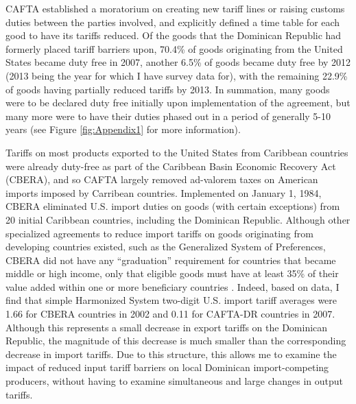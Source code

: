 \documentclass[12pt]{article}
\begin{document}
CAFTA established a moratorium on creating new tariff lines or raising customs 
duties between the parties involved, and explicitly defined a time table for each good to have its 
tariffs reduced. Of the goods that the Dominican Republic had formerly placed tariff barriers upon,
70.4\% of goods originating from the United States became duty free in 2007, another 6.5\%
of goods became duty free by 2012 (2013 being the year for which I have survey data for), with
the remaining 22.9\% of goods having partially reduced tariffs by 2013.
In summation, many goods were to be declared duty free initially upon implementation of the agreement, 
but many more were to have their duties phased out in a period of generally 5-10 years 
(see Figure \ref{fig:Appendix1} for more information). 

Tariffs on most products exported to the United States from Caribbean countries were 
already duty-free as part of the Caribbean Basin Economic Recovery Act (CBERA), and so CAFTA largely 
removed ad-valorem taxes on American imports imposed by Carribean countries. 
Implemented on January 1, 1984, CBERA eliminated U.S. import duties on goods (with certain
exceptions) from 20 initial Caribbean countries, including the Dominican Republic.
Although other specialized agreements to reduce import tariffs on goods originating from developing 
countries existed, such as the Generalized System of Preferences, CBERA did not have any ``graduation''
requirement for countries that became middle or high income, only that eligible  
goods must have at least 35\% of their value added within one or more beneficiary countries 
\citep{pelzman}. Indeed, based on \citeauthor{wtotariff} data, I find that simple Harmonized
System two-digit U.S. import tariff averages were 1.66 for CBERA countries in 2002 and 0.11 for 
CAFTA-DR countries in 2007. Although this represents a small decrease in export tariffs on
the Dominican Republic, the magnitude of this decrease is much smaller than the corresponding
decrease in import tariffs. Due to this structure, this allows me to examine the impact of reduced 
input tariff barriers on local Dominican import-competing producers, without having to 
examine simultaneous and large changes in output tariffs.
\end{document}
